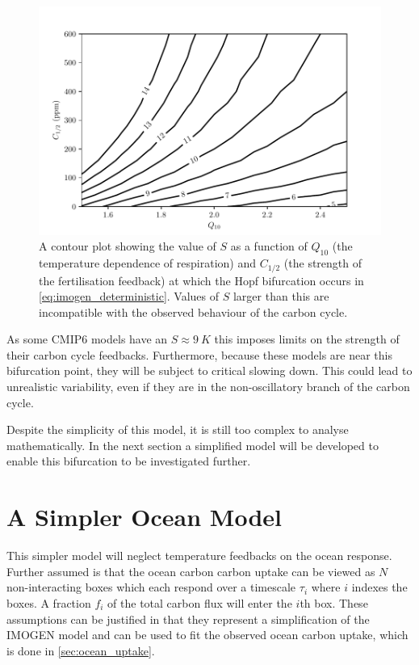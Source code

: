 \begin{figure}
  \centering
  \includegraphics[keepaspectratio,width=\textwidth]{imogen_critical_S_Q10_ca05}
  \caption[The dependence of the critical values of $S$ on $Q_{10}$ and $C_{1/2}$]{A contour plot showing the value of $S$ as a function of $Q_{10}$ (the temperature dependence of respiration)
    and $C_{1/2}$ (the strength of the  fertilisation
    feedback) at which the Hopf bifurcation occurs in \cref{eq:imogen_deterministic}.
    Values of $S$ larger than  this are incompatible with the observed behaviour of the carbon cycle.}
  \label{fig:imogen_bifurcation_plane}
\end{figure}

As some CMIP6 models have an $S \approx\SI{9}{K}$ this imposes limits on the strength of their carbon cycle feedbacks. Furthermore, because these models are
near this bifurcation point, they will be subject to critical slowing down. This could lead to unrealistic  variability, even if they are
in the non-oscillatory branch of the carbon cycle.

Despite the simplicity of this model, it is still too complex to analyse mathematically. In the next section a simplified model will be developed to enable this bifurcation to be investigated further.

\section{A Simpler Ocean Model}
This simpler model will neglect temperature feedbacks on the ocean response. Further assumed is that the ocean carbon carbon uptake
can be viewed as $N$ non-interacting boxes which each respond over a timescale $\tau_i$ where $i$ indexes the boxes. A fraction $f_i$ of the total carbon
flux will enter the $i$th box. These assumptions can be justified in that they represent a simplification of the IMOGEN model and can be used to fit the observed ocean carbon
uptake, which is done in \cref{sec:ocean_uptake}.


